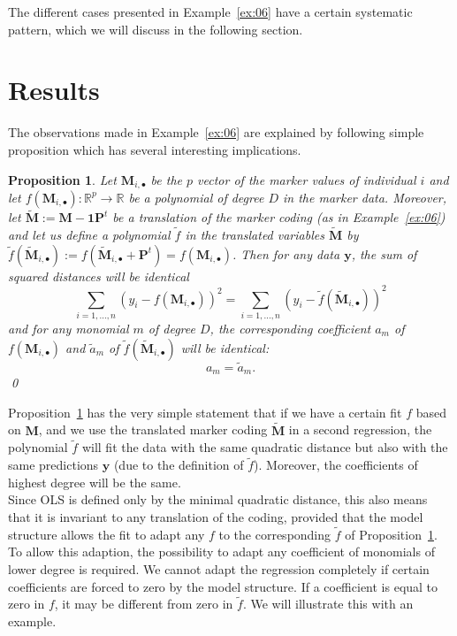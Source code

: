 \documentclass{bmcart}
\newtheorem{proposition}{Proposition}
\newcommand{\M}{\mathbf{M}}
\newcommand{\0}{\mathbf{0}}
\newcommand{\y}{\mathbf{y}}
\renewcommand{\P}{\mathbf{P}}
\begin{document}
The different cases presented in Example~\ref{ex:06} have a certain systematic pattern, which we will discuss in the following section. 


\section*{Results} 
The observations made in Example~\ref{ex:06} are explained by following simple proposition
which has several interesting implications.
\begin{proposition}\label{prop:01} Let $\M_{i,\bullet}$ be the $p$ vector of the marker values of individual $i$ and let $f(\M_{i,\bullet}): \mathbb{R}^p \rightarrow \mathbb{R}$ be a polynomial of degree $D$ in the marker data. Moreover, let $\tilde{\M}:= \M - \mathbf{1} \P^t$ be a translation of the marker coding (as in Example~\ref{ex:06}) and let us define a polynomial $\tilde{f}$ in the translated variables $\tilde{\M}$ by $\tilde{f}(\tilde{\M}_{i,\bullet}):= f(\tilde{\M}_{i,\bullet} +  \P^t)=f(\M_{i,\bullet})$. Then for any data $\y$, the sum of squared distances will be identical 
	$$ \sum_{i=1,...,n} (y_i - f(\M_{i,\bullet}))^2 = \sum_{i=1,...,n} (y_i - \tilde{f}(\tilde{\M}_{i,\bullet}))^2 $$
	and for any monomial $m$ of degree $D$, the corresponding coefficient $a_m$ of $f(\M_{i,\bullet})$ and $\tilde{a}_m$ of $\tilde{f}(\tilde{\M}_{i,\bullet})$ will be identical:
	$$a_m = \tilde{a}_m.$$ \qed
\end{proposition}
Proposition~\ref{prop:01} has the very simple statement that if we have a certain fit $f$ based on $\M$, and we use the translated marker coding $\tilde{\M}$ in a second regression, the polynomial $\tilde{f}$ will fit the data with the same quadratic distance but also with the same predictions $\hat{\y}$ (due to the definition of $\tilde{f}$). Moreover, the coefficients of highest degree will be the same.  \\

Since OLS is defined only by the minimal quadratic distance, this also means that it is invariant to any translation of the coding, provided that the model structure allows the fit to 
adapt any $f$ to the corresponding $\tilde{f}$ of Proposition~\ref{prop:01}.
To allow this adaption, the possibility to adapt any coefficient of monomials of lower degree is required.
We cannot adapt the regression completely if certain coefficients are forced to zero by the model structure. If a coefficient is equal to zero in $f$, it may be different from zero in $\tilde{f}$.
We will illustrate this with an example. 
\end{document}
